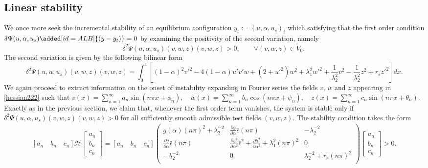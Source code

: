\subsection{Linear stability}
We once more seek the incremental stability of an equilibrium configuration $y_t := (u, \alpha, u_s)_t$ which satisfying that the first order condition $\delta \Psi(u,\alpha,u_s)\added[id=ALB]{(y-y_t)}=0$  by examining the positivity of the second variation, namely
\begin{equation*}
\delta^2 \widetilde\Psi(u,\alpha,u_s)(v,w,z)(v,w,z)>0, \qquad \forall (v,w,z)\in \widetilde V_0,
\end{equation*}The second variation is given by the following bilinear form 
\begin{equation}
\delta^2 \Psi(u,\alpha,u_s)(v,w,z)(v,w,z)=\int_0^1 \left[(1-\alpha)^2v'^2 
- 4(1-\alpha)u' v'w+(2+ u'^2)w^2+\lambda_1^2w'^2 +\frac{1}{\lambda_2^2} v^2 -\frac{1}{\lambda_2^2} z^2+r_sz'^2\right]dx.\label{hessian222}\end{equation}
We again proceed to extract information on the onset of instability expanding in Fourier series the fields $v$, $w$ and $z$ appearing in \eqref{hessian222} such that $v(x)=\sum_{n=1}^{\infty} a_{n} \sin \left(n \pi x+\phi_{n}\right), \quad w(x)=\sum_{n=1}^{\infty} b_{n} \cos \left(n \pi x+\psi_{n}\right),\quad z(x)=\sum_{n=1}^{\infty} c_{n} \sin \left(n \pi x+\theta_{n}\right)$. Exactly as in the previous section, we claim that, whenever the first order term vanishes, the system is stable only if $\delta^2 \Psi(u,\alpha,u_s)(v,w,z)(v,w,z)>0$ for all sufficiently smooth admissible test fields $(v, w, z)$. The stability condition  takes the form
\begin{align}\left[ a_n \quad b_n \quad c_n  \right] \mathcal{H} \left[ \begin{array}{c} a_n \\ b_n  \\ c_n\end{array} \right]=\left[ a_n \quad b_n \quad c_n \right]\left(
\begin{array}{ccc}
g(\alpha)(n\pi)^2+\lambda_2^{-2}& \frac{\partial g}{\partial \alpha}\bar\epsilon(n\pi) &  -\lambda_2^{-2} \\
\frac{\partial g}{\partial \alpha}\bar\epsilon(n\pi) & \frac{\partial g^2}{\partial \alpha^2}\bar\epsilon^2+ \frac{\partial h^2}{\partial \alpha^2}+\lambda_1^2(n\pi)^2 & 0 \\
 -\lambda_2^{-2} & 0 & \lambda_2^{-2} +r_s(n\pi)^2\\
\end{array}
\right)\left[ \begin{array}{c} a_n \\ b_n \\c_n \end{array} \right]>0.\label{hessian3}\end{align}
